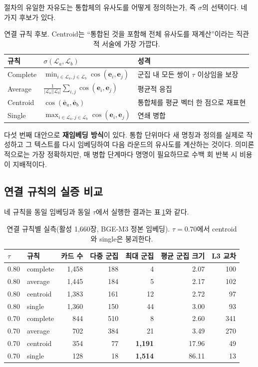 \documentclass[11pt,a4paper]{article}
\newcommand{\cL}{\mathcal{L}}
\begin{document}
절차의 유일한 자유도는 통합체의 유사도를 어떻게 정의하는가, 즉 $\sigma$의 선택이다. 네 가지 후보가 있다.

\begin{table}[h]
\centering
\small
\begin{tabular}{@{}lll@{}}
\toprule
규칙 & $\sigma(\cL_a, \cL_b)$ & 성격 \\
\midrule
Complete & $\min_{i \in \cL_a, j \in \cL_b} \cos(\mathbf{e}_i, \mathbf{e}_j)$ & 군집 내 모든 쌍이 $\tau$ 이상임을 보장 \\
Average  & $\frac{1}{|\cL_a||\cL_b|}\sum_{i,j} \cos(\mathbf{e}_i, \mathbf{e}_j)$ & 평균적 응집 \\
Centroid & $\cos(\bar{\mathbf{e}}_a, \bar{\mathbf{e}}_b)$ & 통합체를 평균 벡터 한 점으로 재표현 \\
Single   & $\max_{i \in \cL_a, j \in \cL_b} \cos(\mathbf{e}_i, \mathbf{e}_j)$ & 연쇄 병합 \\
\bottomrule
\end{tabular}
\caption{연결 규칙 후보. Centroid는 ``통합된 것을 포함해 전체 유사도를 재계산''이라는 직관적 서술에 가장 가깝다.}
\end{table}

다섯 번째 대안으로 \textbf{재임베딩 방식}이 있다. 통합 단위마다 새 명칭과 정의를 실제로 작성하고 그 텍스트를 다시 임베딩하여 다음 라운드의 유사도를 계산하는 것이다. 의미론적으로는 가장 정확하지만, 매 병합 단계마다 명명이 필요하므로 수백 회 반복 시 비용이 지배적이다.

\subsection{연결 규칙의 실증 비교}

네 규칙을 동일 임베딩과 동일 $\tau$에서 실행한 결과는 표\,\ref{tab:linkage}와 같다.

\begin{table}[h]
\centering
\small
\begin{tabular}{@{}llrrrrr@{}}
\toprule
$\tau$ & 규칙 & 카드 수 & 다중 군집 & 최대 군집 & 평균 군집 크기 & L3 교차 \\
\midrule
0.80 & complete & 1{,}458 & 188 & 4 & 2.07 & 100 \\
0.80 & average  & 1{,}445 & 184 & 5 & 2.17 & 102 \\
0.80 & centroid & 1{,}383 & 161 & 12 & 2.72 & 97 \\
0.80 & single   & 1{,}360 & 150 & 44 & 3.00 & 93 \\
\midrule
0.70 & complete & 844 & 510 & 8 & 2.60 & 341 \\
0.70 & average  & 702 & 384 & 21 & 3.49 & 270 \\
0.70 & centroid & 354 & 77 & \textbf{1{,}191} & 17.96 & 49 \\
0.70 & single   & 128 & 18 & \textbf{1{,}514} & 86.11 & 13 \\
\bottomrule
\end{tabular}
\caption{연결 규칙별 실측(활성 1{,}660장, BGE-M3 정본 임베딩). $\tau=0.70$에서 centroid와 single은 붕괴한다.}
\label{tab:linkage}
\end{table}
\end{document}

